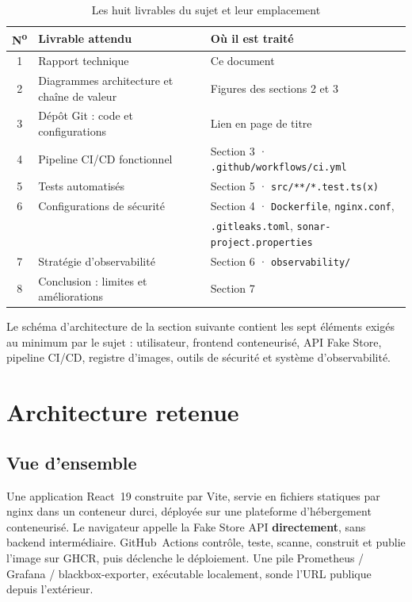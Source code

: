 \documentclass[11pt,a4paper]{article}
\newcommand{\code}[1]{{\shorthandoff{:;!?}\texttt{#1}}}
\begin{document}
\begin{table}[htbp]
\centering
\small
\begin{tabular}{@{}c l l@{}}
\toprule
\textbf{N\textsuperscript{o}} & \textbf{Livrable attendu} & \textbf{Où il est traité} \\
\midrule
1 & Rapport technique               & Ce document \\
2 & Diagrammes architecture et chaîne de valeur & Figures des sections 2 et 3 \\
3 & Dépôt Git : code et configurations & Lien en page de titre \\
4 & Pipeline CI/CD fonctionnel      & Section 3 · \code{.github/workflows/ci.yml} \\
5 & Tests automatisés               & Section 5 · \code{src/**/*.test.ts(x)} \\
6 & Configurations de sécurité      & Section 4 · \code{Dockerfile}, \code{nginx.conf}, \\
  &                                 & \code{.gitleaks.toml}, \code{sonar-project.properties} \\
7 & Stratégie d'observabilité       & Section 6 · \code{observability/} \\
8 & Conclusion : limites et améliorations & Section 7 \\
\bottomrule
\end{tabular}
\caption{Les huit livrables du sujet et leur emplacement}
\label{tab:livrables}
\end{table}

Le schéma d'architecture de la section suivante contient les sept éléments
exigés au minimum par le sujet : utilisateur, frontend conteneurisé, API
Fake Store, pipeline CI/CD, registre d'images, outils de sécurité et système
d'observabilité.

\section{Architecture retenue}

\subsection{Vue d'ensemble}

Une application React~19 construite par Vite, servie en fichiers statiques
par nginx dans un conteneur durci, déployée sur une plateforme d'hébergement
conteneurisé. Le navigateur appelle la Fake Store API \textbf{directement},
sans backend intermédiaire. GitHub~Actions contrôle, teste, scanne,
construit et publie l'image sur GHCR, puis déclenche le déploiement. Une
pile Prometheus / Grafana / blackbox-exporter, exécutable localement, sonde
l'URL publique depuis l'extérieur.
\end{document}
